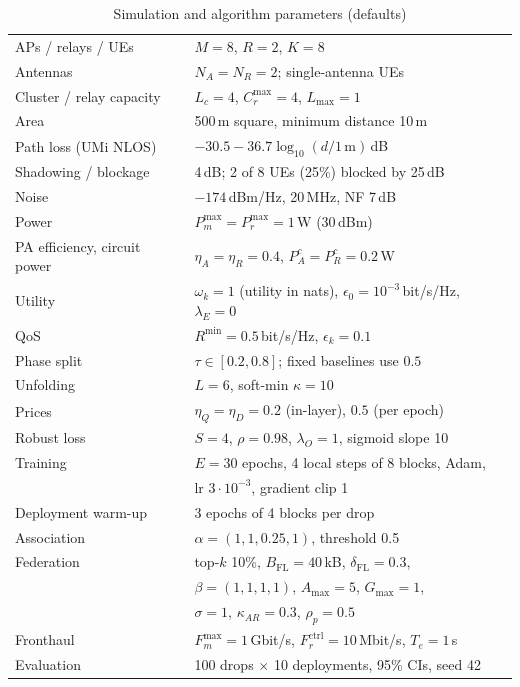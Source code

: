 \documentclass[conference]{IEEEtran}
\begin{document}
\begin{table}[t]
\caption{Simulation and algorithm parameters (defaults)}
\label{tab:params}
\centering
\scriptsize
\setlength{\tabcolsep}{3pt}
\begin{tabular}{ll}
\toprule
APs / relays / UEs & $M=8$, $R=2$, $K=8$ \\
Antennas & $N_A = N_R = 2$; single-antenna UEs \\
Cluster / relay capacity & $L_c = 4$, $C_r^{\max}=4$, $L_{\max}=1$ \\
Area & 500\,m square, minimum distance 10\,m \\
Path loss (UMi NLOS) & $-30.5 - 36.7\log_{10}(d/1\,\mathrm{m})$\,dB \\
Shadowing / blockage & 4\,dB; 2 of 8 UEs (25\%) blocked by 25\,dB \\
Noise & $-174$\,dBm/Hz, 20\,MHz, NF 7\,dB \\
Power & $P^{\max}_m=P^{\max}_r=1$\,W (30\,dBm) \\
PA efficiency, circuit power & $\eta_A=\eta_R=0.4$, $P^c_A=P^c_R=0.2$\,W \\
Utility & $\omega_k=1$ (utility in nats), $\epsilon_0=10^{-3}$\,bit/s/Hz,
  $\lambda_E=0$ \\
QoS & $R^{\min}=0.5$\,bit/s/Hz, $\epsilon_k = 0.1$ \\
Phase split & $\tau\in[0.2,0.8]$; fixed baselines use $0.5$ \\
\midrule
Unfolding & $L=6$, soft-min $\kappa=10$ \\
Prices & $\eta_Q=\eta_D=0.2$ (in-layer), $0.5$ (per epoch) \\
Robust loss & $S=4$, $\rho=0.98$, $\lambda_O=1$, sigmoid slope 10 \\
Training & $E=30$ epochs, 4 local steps of 8 blocks, Adam, \\
 & lr $3{\cdot}10^{-3}$, gradient clip 1 \\
Deployment warm-up & 3 epochs of 4 blocks per drop \\
Association & $\alpha=(1,1,0.25,1)$, threshold 0.5 \\
Federation & top-$k$ 10\%, $B_{\mathrm{FL}}=40$\,kB,
  $\delta_{\mathrm{FL}}=0.3$, \\
 & $\beta=(1,1,1,1)$, $A_{\max}=5$, $G_{\max}=1$, \\
 & $\sigma=1$, $\kappa_{AR}=0.3$, $\rho_p=0.5$ \\
Fronthaul & $F^{\max}_m=1$\,Gbit/s, $F^{\mathrm{ctrl}}_r=10$\,Mbit/s,
  $T_e = 1$\,s \\
Evaluation & 100 drops $\times$ 10 deployments, 95\% CIs, seed 42 \\
\bottomrule
\end{tabular}
\end{table}
\end{document}
